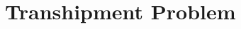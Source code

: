 \documentclass[../main.tex]{subfiles}
\begin{document}
\section{Transhipment Problem}
\end{document}
